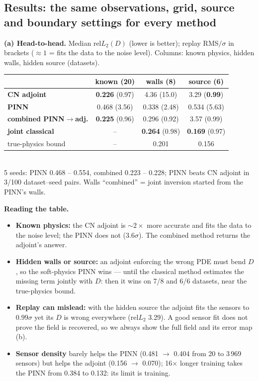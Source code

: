 \documentclass[a0,portrait]{a0poster}
\newcommand{\hl}[1]{\textbf{\color{NavyBlue}#1}}
\begin{document}
\begin{minipage}[c]{\linewidth}
\begin{framed}
\section*{Results: the same observations, grid, source and boundary settings for every method}
\small
\noindent\begin{minipage}[t]{0.38\linewidth}
\textbf{(a) Head-to-head.} Median rel$L_2(D)$ (lower is better); replay RMS$/\sigma$ in brackets
($\approx1$ = fits the data to the noise level). Columns: known physics, hidden walls, hidden source (datasets).\\[0.3cm]
\renewcommand{\arraystretch}{1.35}
\begin{tabular}{lccc}
\toprule
 & \textbf{known (20)} & \textbf{walls (8)} & \textbf{source (6)} \\
\midrule
\textcolor{adj}{\textbf{CN adjoint}} & \textbf{0.226} (0.97) & 4.36 (15.0) & 3.29 (\hl{0.99}) \\
\textcolor{pinn}{\textbf{PINN}} & 0.468 (3.56) & 0.338 (2.48) & 0.534 (5.63) \\
\textcolor{joint}{\textbf{combined PINN$\to$adj.}} & \textbf{0.225} (0.96) & 0.296 (0.92) & 3.57 (0.99) \\
\textcolor{joint}{\textbf{joint classical}} & -- & \textbf{0.264} (0.98) & \textbf{0.169} (0.97) \\
\midrule
true-physics bound & -- & 0.201 & 0.156 \\
\bottomrule
\end{tabular}\\[0.3cm]
{\color{Blue}\footnotesize 5 seeds: PINN 0.468 -- 0.554, combined 0.223 -- 0.228; PINN beats CN adjoint in 3/100
dataset--seed pairs. Walls ``combined'' = joint inversion started from the PINN's walls.}
\end{minipage}\hfill
\begin{minipage}[t]{0.58\linewidth}
\textbf{Reading the table.}
\begin{itemize}
\item \textbf{Known physics:} the CN adjoint is $\sim2\times$ more accurate and fits the data to the noise level;
the PINN does not ($3.6\sigma$). The combined method returns the adjoint's answer.
\item \textbf{Hidden walls or source:} an adjoint enforcing the wrong PDE must bend $D$, so the soft-physics PINN
wins --- until the classical method estimates the missing term jointly with $D$: then it wins on 7/8 and 6/6
datasets, near the true-physics bound.
\item \textbf{Replay can mislead:} with the hidden source the adjoint fits the sensors to $0.99\sigma$ yet its $D$ is
wrong everywhere (rel$L_2$ 3.29). A good sensor fit does not prove the field is recovered, so we always show
the full field and its error map (b).
\item \textbf{Sensor density} barely helps the PINN (0.481 $\to$ 0.404 from 20 to 3\,969 sensors) but helps the
adjoint (0.156 $\to$ 0.070); 16$\times$ longer training takes the PINN from 0.384 to 0.132: its limit is training.
\end{itemize}
\end{minipage}


\end{framed}
\end{minipage}
\end{document}
